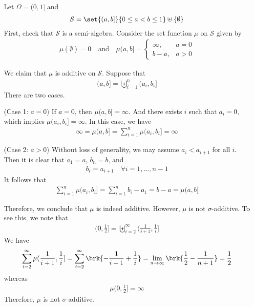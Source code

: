 \documentclass[thmcnt=section, 12pt, color=purple]{my-elegantbook}
\begin{document}
\begin{example} \label{eg:2}
	Let $\Omega = (0, 1]$ and
	\begin{align*}
		\mathcal{S} = \set{(a, b]}{0 \leq a < b \leq 1}
		\uplus \{\emptyset\}
	\end{align*}
	First, check that $\mathcal{S}$ is a semi-algebra.
	Consider the set function $\mu$ on $\mathcal{S}$ given by
	\begin{align*}
		\mu (\emptyset) = 0
		\quad \text{and} \quad
		\mu (a, b] = \begin{cases}
			\infty,
			&a = 0 \\
			b - a,
			&a > 0
		\end{cases}
	\end{align*}
	
	We claim that $\mu$ is additive on $\mathcal{S}$.
	Suppose that
	\begin{align*}
		(a, b]
		= \biguplus_{i=1}^n (a_i, b_i]
	\end{align*}
	There are two cases.

	(Case 1: $a = 0$) If $a = 0$, then $\mu (a, b] = \infty$.
	And there exists $i$ such that $a_i = 0$,
	which implies $\mu(a_i, b_i] = \infty$.
	In this case, we have 
	\begin{align*}
		\infty = \mu (a, b]
		= \sum_{i=1}^n \mu(a_i, b_i] = \infty
	\end{align*}

	(Case 2: $a > 0$) Without loss of generality,
	we may assume $a_i < a_{i+1}$ for all $i$.
	Then it is clear that $a_1 = a$, $b_n = b$, and
	\begin{align*}
		b_i = a_{i+1}
		\quad \forall i = 1, \ldots, n-1
	\end{align*}
	It follows that 
	\begin{align*}
		\sum_{i=1}^n \mu (a_i, b_i]
		= \sum_{i=1}^n b_i - a_1
		= b - a 
		= \mu (a, b]
	\end{align*}

	Therefore, we conclude that $\mu$ is indeed additive.
	However, $\mu$ is not $\sigma$-additive.
	To see this, we note that 
	\begin{align*}
		(0, \frac{1}{2}]
		= \biguplus_{i = 2}^\infty ( \frac{1}{i+1}, \frac{1}{i} ]
	\end{align*}
	We have 
	\begin{align*}
		\sum_{i=2}^\infty \mu(\frac{1}{i+1}, \frac{1}{i}]
		= \sum_{i=2}^\infty \brk{ -\frac{1}{i+1} + \frac{1}{i}}
		= \lim_{n \to \infty} \brk{ \frac{1}{2} - \frac{1}{n+1} }
		= \frac{1}{2}
	\end{align*}
	whereas
	\begin{align*}
		\mu (0, \frac{1}{2}] = \infty
	\end{align*}
	Therefore, $\mu$ is not $\sigma$-additive.
\end{example}
\end{document}
